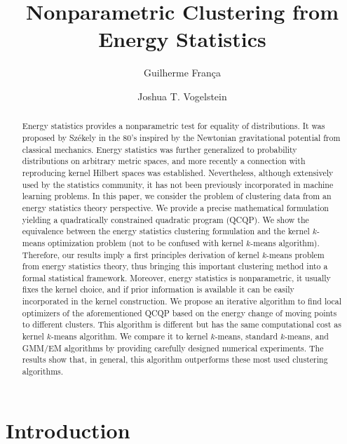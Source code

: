 \documentclass[aps,preprint,nofootinbib,floatfix]{revtex4-1}
\begin{document}
\title{Nonparametric Clustering from  Energy Statistics}

\author{Guilherme Fran\c ca}

\author{Joshua T. Vogelstein}



\begin{abstract}
Energy statistics provides a nonparametric test for equality of distributions.
It was proposed by 
Sz\' ekely in the 80's
inspired by the Newtonian gravitational potential from classical mechanics. 
Energy statistics
was further generalized to probability 
distributions on arbitrary metric spaces,
and more recently a connection with reproducing kernel Hilbert spaces 
was established.
Nevertheless, although extensively used by the statistics community, it
has not been previously incorporated in machine learning problems.
In this paper, we consider the problem of clustering data from
an energy statistics theory perspective.
We provide a precise mathematical formulation yielding
a quadratically constrained quadratic program (QCQP).
We show the equivalence between the energy statistics clustering
formulation 
and the kernel $k$-means optimization problem (not to be confused with
kernel $k$-means algorithm). 
Therefore, our results imply a first principles derivation of 
kernel $k$-means problem
from energy statistics theory, thus bringing this important 
clustering method into a formal statistical framework.
Moreover, energy statistics is nonparametric, it usually fixes
the kernel choice,
and if prior information is available
it can be easily incorporated in the kernel construction.
We propose an iterative algorithm
to find local optimizers of the aforementioned QCQP based on the 
energy change
of moving points to different clusters. This algorithm 
is different but has the same computational cost as kernel $k$-means 
algorithm.
We compare it to
kernel $k$-means, standard $k$-means, and GMM/EM algorithms by 
providing carefully designed numerical experiments. The results
show that, in general, this algorithm outperforms
these most used clustering algorithms.
\end{abstract}

\maketitle


\section{Introduction}
\end{document}

